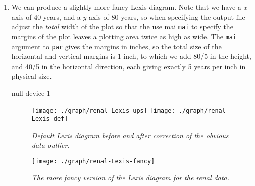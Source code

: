 \begin{enumerate}

\item We can produce a slightly more fancy Lexis diagram. Note that we
  have a $x$-axis of 40 years, and a $y$-axis of 80 years, so when
  specifying the output file adjust the \emph{total} width of the plot
  so that the use mai \texttt{mai} to specify the margins of the plot
  leaves a plotting area twice as high as wide. The \texttt{mai}
  argument to \texttt{par} gives the margins in inches, so the total
  size of the horizontal and vertical margins is 1 inch, to which we
  add 80/5 in the height, and 40/5 in the horizontal direction, each
  giving exactly 5 years per inch in physical size.
\begin{Schunk}
\begin{Soutput}
null device 
          1 
\end{Soutput}
\end{Schunk}
\begin{figure}[tb]
  \centering
  \texttt{[image: ./graph/renal-Lexis-ups]}
  \texttt{[image: ./graph/renal-Lexis-def]}
  \caption{\it Default Lexis diagram before and after correction of
    the obvious data outlier.}
  \label{fig:Lexis-ups}
\end{figure}

\begin{figure}[tb]
  \centering
  \texttt{[image: ./graph/renal-Lexis-fancy]}
  \caption{\it The more fancy version of the Lexis diagram for the
    renal data.}
  \label{fig:Lexis-fancy}
\end{figure}


\end{enumerate}
